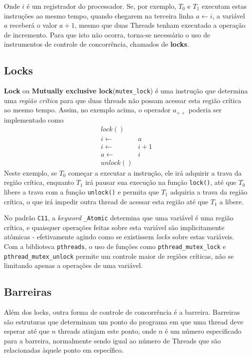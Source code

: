 Onde $i$ é um registrador do processador. Se, por exemplo, $T_0$ e $T_1$ executam estas instruções ao mesmo tempo, quando chegarem na terceira linha $a \gets i$, a variável $a$ receberá o valor $a+1$, mesmo que duas Threads tenham executado a operação de incremento. Para que isto não ocorra, torna-se necessário o uso de instrumentos de controle de concorrência, chamados de \textbf{locks}.

\subsection{Locks}
\textbf{Lock} ou \textbf{Mutually exclusive lock}(\texttt{mutex\_lock}) é uma instrução que determina uma \textit{região crítica} para que duas threads não possam acessar esta região crítica ao mesmo tempo. Assim, no exemplo acima, o operador $a_{++}$ poderia ser implementado como
\begin{align}
lock()\quad&\nonumber\\
i\gets& a\nonumber\\
i\gets& i+1\nonumber\\
a\gets& i\nonumber\\
unlock()&\nonumber
\end{align}
Neste exemplo, se $T_0$ começar a executar a instrução, ele irá adquirir a trava da região crítica, enquanto $T_1$ irá pausar sua execução na função \texttt{lock()}, até que $T_0$ libere a trava com a função \texttt{unlock()} e permita que $T_1$ adquiria a trava da região crítica, o que irá impedir outra thread de acessar esta região até que $T_1$ a libere.

No padrão \texttt{C11}, a \textit{keyword} \texttt{\_Atomic} determina que uma variável é uma região crítica, e quaisquer operações feitas sobre esta variável são implicitamente atômicas - efetivamente agindo como se existissem \textit{locks} sobre estas variáveis. Com a biblioteca \texttt{pthreads}, o uso de funções como \texttt{pthread\_mutex\_lock} e \texttt{pthread\_mutex\_unlock} permite um controle maior de regiões críticas, não se limitando apenas a operações de uma variável.

\subsection{Barreiras}
Além dos locks, outra forma de controle de concorrência é a barreira. Barreiras são estruturas que determinam um ponto do programa em que uma thread deve esperar até que $n$ threads atinjam este ponto, onde $n$ é um número especificado para a barreira, normalmente sendo igual ao número de Threads que são relacionadas àquele ponto em específico.


